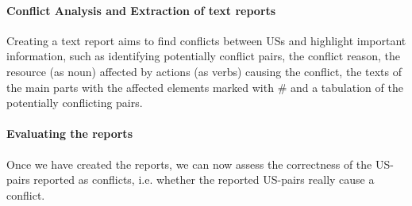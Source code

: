 
\paragraph{Conflict Analysis and Extraction of text reports} Creating a text report aims to find conflicts between USs and highlight important information, such as identifying potentially conflict pairs, the conflict reason, the resource (as noun) affected by actions (as verbs) causing the conflict, the texts of the main parts with the affected elements marked with \# and a tabulation of the potentially conflicting pairs.

\paragraph{Evaluating the reports} Once we have created the reports, we can now assess the correctness of the US-pairs reported as conflicts, i.e. whether the reported US-pairs really cause a conflict.

